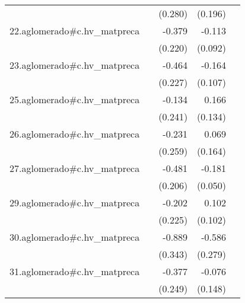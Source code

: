 {\begin{longtable}{l*{4}{D{.}{.}{-1}}}
            &                     &     (0.280)         &     (0.196)         &                     \\
\addlinespace
22.aglomerado#c.hv\_matpreca&                     &      -0.379         &      -0.113         &                     \\
            &                     &     (0.220)         &     (0.092)         &                     \\
\addlinespace
23.aglomerado#c.hv\_matpreca&                     &      -0.464\sym{*}  &      -0.164         &                     \\
            &                     &     (0.227)         &     (0.107)         &                     \\
\addlinespace
25.aglomerado#c.hv\_matpreca&                     &      -0.134         &       0.166         &                     \\
            &                     &     (0.241)         &     (0.134)         &                     \\
\addlinespace
26.aglomerado#c.hv\_matpreca&                     &      -0.231         &       0.069         &                     \\
            &                     &     (0.259)         &     (0.164)         &                     \\
\addlinespace
27.aglomerado#c.hv\_matpreca&                     &      -0.481\sym{*}  &      -0.181\sym{***}&                     \\
            &                     &     (0.206)         &     (0.050)         &                     \\
\addlinespace
29.aglomerado#c.hv\_matpreca&                     &      -0.202         &       0.102         &                     \\
            &                     &     (0.225)         &     (0.102)         &                     \\
\addlinespace
30.aglomerado#c.hv\_matpreca&                     &      -0.889\sym{**} &      -0.586\sym{*}  &                     \\
            &                     &     (0.343)         &     (0.279)         &                     \\
\addlinespace
31.aglomerado#c.hv\_matpreca&                     &      -0.377         &      -0.076         &                     \\
            &                     &     (0.249)         &     (0.148)         &                     \\

\end{longtable}}
